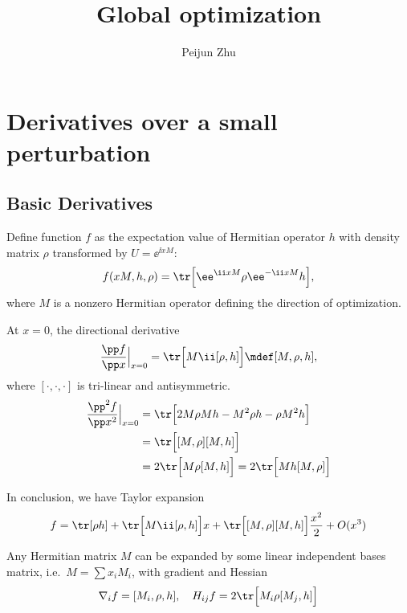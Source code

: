 \documentclass[10pt]{article}
\title{Global optimization}
\author{Peijun Zhu}
\begin{document}
\maketitle
\section{Derivatives over a small perturbation}
\subsection{Basic Derivatives}
Define function $f$ as the expectation value of Hermitian operator $h$ with density matrix $\rho$ transformed by $U=\ee^{\ii xM}$:
\begin{equation}
f(xM, h, \rho)=\tr \Big[\ee^{\ii xM}\rho \ee^{-\ii xM}h\Big],
\end{equation}
where $M$ is a nonzero Hermitian operator defining the direction of optimization. 

At $x=0$, the directional derivative
\[\frac{\pp f}{\pp x}\Big|_{x=0}=\tr \Big[M\ii [\rho, h]\Big]\mdef [M, \rho, h],\]
where $[\cdot, \cdot, \cdot]$ is tri-linear and antisymmetric.
\begin{align}
\frac{\pp^2 f}{\pp x^2}\Big|_{x=0}&=\tr \Big[2M\rho Mh-M^2\rho h-\rho M^2h\Big]\\
&=\tr \Big[[M,\rho][M, h]\Big]\\
&=2\tr \Big[M\rho [M, h]\Big]=2\tr \Big[Mh [M, \rho]\Big]
\end{align}

In conclusion, we have Taylor expansion
\[f= \tr[\rho h] + \tr\Big[M\ii[\rho, h]\Big]x + \tr \Big[[M,\rho][M, h]\Big]\frac{x^2}{2}+O(x^3) \]

Any Hermitian matrix $M$ can be expanded by some linear independent bases matrix, i.e.\ $M=\sum x_iM_i$, with gradient and Hessian 
\begin{equation}
\nabla_i f=[M_i,\rho, h], \quad H_{ij}f=2\tr \Big[M_i\rho[M_j, h]\Big]
\end{equation}
\end{document}
